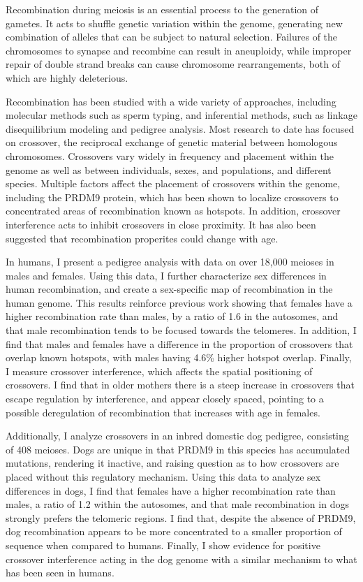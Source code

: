 \documentclass[11pt,twoside,openright,letterpaper]{memoir}
\begin{document}
Recombination during meiosis is an essential process to the generation of gametes.
It acts to shuffle genetic variation within the genome, generating new combination of alleles that can be subject to natural selection.
Failures of the chromosomes to synapse and recombine can result in aneuploidy, while improper repair of double strand breaks can cause chromosome rearrangements, both of which are highly deleterious.

Recombination has been studied with a wide variety of approaches, including molecular methods such as sperm typing, and inferential methods, such as linkage disequilibrium modeling and pedigree analysis.
Most research to date has focused on crossover, the reciprocal exchange of genetic material between homologous chromosomes.
Crossovers vary widely in frequency and placement within the genome as well as between individuals, sexes, and populations, and different species.
Multiple factors affect the placement of crossovers within the genome, including the PRDM9 protein, which has been shown to localize crossovers to concentrated areas of recombination known as hotspots.
In addition, crossover interference acts to inhibit crossovers in close proximity.
It has also been suggested that recombination properites could change with age.

In humans, I present a pedigree analysis with data on over 18,000 meioses in males and females.
Using this data, I further characterize sex differences in human recombination, and create a sex-specific map of recombination in the human genome.
This results reinforce previous work showing that females have a higher recombination rate than males, by a ratio of 1.6 in the autosomes, and that male recombination tends to be focused towards the telomeres.
In addition, I find that males and females have a difference in the proportion of crossovers that overlap known hotspots, with males having 4.6\% higher hotspot overlap.
Finally, I measure crossover interference, which affects the spatial positioning of crossovers.
I find that in older mothers there is a steep increase in crossovers that escape regulation by interference, and appear closely spaced, pointing to a possible deregulation of recombination that increases with age in females.

Additionally, I analyze crossovers in an inbred domestic dog pedigree, consisting of 408 meioses.
Dogs are unique in that PRDM9 in this species has accumulated mutations, rendering it inactive, and raising question as to how crossovers are placed without this regulatory mechanism.
Using this data to analyze sex differences in dogs, I find that females have a higher recombination rate than males, a ratio of 1.2 within the autosomes, and that male recombination in dogs strongly prefers the telomeric regions.
I find that, despite the absence of PRDM9, dog recombination appears to be more concentrated to a smaller proportion of sequence when compared to humans.
Finally, I show evidence for positive crossover interference acting in the dog genome with a similar mechanism to what has been seen in humans.
\end{document}
